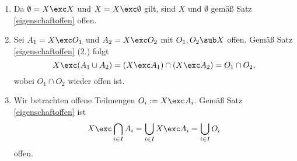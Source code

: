 \begin{beweis}
\begin{enumerate}
\item Da $\emptyset = X \exc X$ und $X = X \exc \emptyset$ gilt, sind $X$ und $\emptyset$ gemäß Satz \ref{eigenschaftoffen} offen.
\item Sei $A_1 = X \exc O_1$ und $A_2 = X \exc O_2$ mit $O_1, O_2 \sub X$ offen. Gemäß Satz \ref{eigenschaftoffen} (2.) folgt 
\begin{equation}
X \exc (A_1 \cup A_2) = (X \exc A_1) \cap (X \exc A_2) = O_1 \cap O_2,
\end{equation}
wobei $O_1 \cap O_2$ wieder offen ist.
\item Wir betrachten offene Teilmengen $O_i := X \exc A_i$. Gemäß Satz \ref{eigenschaftoffen} ist 
\begin{equation}
X \exc \bigcap_{i\in I} A_i = \bigcup_{i \in I} X \exc A_i = \bigcup_{i \in I} O_i 
\end{equation}
offen.
\end{enumerate}
\end{beweis}
